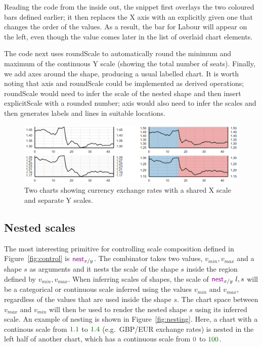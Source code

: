 \documentclass{jfp}
\newcommand{\num}[1]{\textcolor{numclr}{#1}}
\newcommand{\strf}[1]{\textnormal{\textcolor{strclr}{\sffamily #1}}}
\newcommand{\kvd}[1]{\textnormal{\textcolor{kvdclr}{\sffamily #1}}}
\begin{document}
\noindent
Reading the code from the inside out, the snippet first overlays the two coloured bars defined
earlier; it then replaces the X axis with an explicitly given one that changes the order of the
values. As a result, the bar for \strf{Labour} will appear on the left, even though the value
comes later in the list of overlaid chart elements.

The code next uses \kvd{roundScale} to automatically round the minimum and maximum of the
continuous Y scale (showing the total number of seats). Finally, we add axes around the shape,
producing a usual labelled chart.  It is worth noting that \kvd{axis} and \kvd{roundScale}
could be implemented as derived operations; \kvd{roundScale} would need to infer the scale of
the nested shape and then insert \kvd{explicitScale} with a rounded number; \kvd{axis}
would also need to infer the scales and then generates labels and lines in suitable locations.

\begin{figure}
\includegraphics[scale=0.57]{figures/lines}
\vspace{0.25em}
\caption{Two charts showing currency exchange rates with a shared X scale and separate Y scales.}
\label{fig:lines}
\end{figure}

\subsection{Nested scales}

The most interesting primitive for controlling scale composition defined in Figure~\ref{fig:control}
is $\kvd{nest}_{x/y}$. The combinator takes two values, $v_{min}, v_{max}$ and a shape $s$ as arguments
and it nests the scale of the shape $s$ inside the region defined by $v_{min}, v_{max}$. When inferring
scales of shapes, the scale of $\kvd{nest}_{x/y}~l, s$ will be a categorical or continuous scale
inferred using the values $v_{min}$ and $v_{max}$, regardless of the values that are used inside
the shape $s$. The chart space between $v_{max}$ and $v_{min}$ will then be used to render the
nested shape $s$ using its inferred scale. An example of nesting is shown in Figure~\ref{fig:nesting}.
Here, a chart with a continous scale from $\num{1.1}$ to $\num{1.4}$ (e.g.~GBP/EUR exchange rates)
is nested in the left half of another chart, which has a continuous scale from $\num{0}$ to $\num{100}$.
\end{document}
